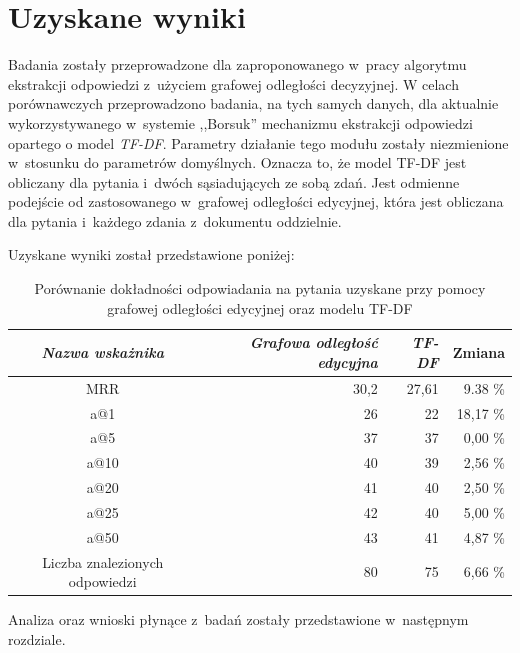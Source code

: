 \documentclass[a4paper, twoside, openright, 12pt]{report}
\begin{document}
    \section{Uzyskane wyniki}
        Badania zostały przeprowadzone dla zaproponowanego w~pracy algorytmu ekstrakcji odpowiedzi z~użyciem
        grafowej odległości decyzyjnej. W celach porównawczych przeprowadzono badania, na tych samych danych,
        dla aktualnie wykorzystywanego w~systemie ,,Borsuk'' mechanizmu ekstrakcji odpowiedzi opartego o model \emph{TF-DF}.
        Parametry działanie tego modułu zostały niezmienione w~stosunku do parametrów domyślnych. Oznacza to, że model
        TF-DF jest obliczany dla pytania i~dwóch sąsiadujących ze sobą zdań. Jest odmienne podejście od zastosowanego
        w~grafowej odległości edycyjnej, która jest obliczana dla pytania i~każdego zdania z~dokumentu oddzielnie.

        Uzyskane wyniki został przedstawione poniżej:

        \begin{table}[h]
            \centering
            \begin{tabular}{ | c | r | r | r | }
              \hline
              \emph{Nazwa wskażnika} & \emph{Grafowa odległość edycyjna} & \emph{TF-DF} & Zmiana \\ \hline
              MRR & 30,2 & 27,61 & 9.38 \% \\ \hline
              a@1 & 26 & 22 & 18,17 \% \\ \hline
              a@5 & 37 & 37 & 0,00 \% \\ \hline
              a@10 & 40 & 39 & 2,56 \% \\ \hline
              a@20 & 41 & 40 & 2,50 \% \\ \hline
              a@25 & 42 & 40 & 5,00 \% \\ \hline
              a@50 & 43 & 41 & 4,87 \% \\ \hline
              Liczba znalezionych odpowiedzi & 80 & 75 & 6,66 \% \\ \hline
            \end{tabular}
            \caption{Porównanie dokładności odpowiadania na pytania uzyskane przy pomocy grafowej odległości edycyjnej
            oraz modelu TF-DF}
            \label{TAB:RESULTS}
        \end{table}

        Analiza oraz wnioski płynące z~badań zostały przedstawione w~następnym rozdziale.
\end{document}

